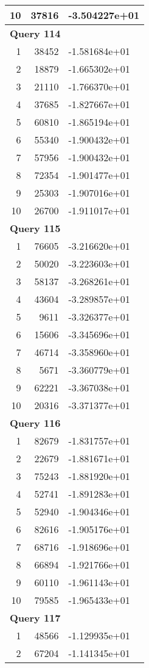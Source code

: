 \begin{longtable}[{p}]{@{}rrp{}@{}}
10 & 37816 & -3.504227e+01 \\
\midrule
\multicolumn{3}{l}{\bfseries Query 114} \\
1 & 38452 & -1.581684e+01 \\
2 & 18879 & -1.665302e+01 \\
3 & 21110 & -1.766370e+01 \\
4 & 37685 & -1.827667e+01 \\
5 & 60810 & -1.865194e+01 \\
6 & 55340 & -1.900432e+01 \\
7 & 57956 & -1.900432e+01 \\
8 & 72354 & -1.901477e+01 \\
9 & 25303 & -1.907016e+01 \\
10 & 26700 & -1.911017e+01 \\
\midrule
\multicolumn{3}{l}{\bfseries Query 115} \\
1 & 76605 & -3.216620e+01 \\
2 & 50020 & -3.223603e+01 \\
3 & 58137 & -3.268261e+01 \\
4 & 43604 & -3.289857e+01 \\
5 & 9611 & -3.326377e+01 \\
6 & 15606 & -3.345696e+01 \\
7 & 46714 & -3.358960e+01 \\
8 & 5671 & -3.360779e+01 \\
9 & 62221 & -3.367038e+01 \\
10 & 20316 & -3.371377e+01 \\
\midrule
\multicolumn{3}{l}{\bfseries Query 116} \\
1 & 82679 & -1.831757e+01 \\
2 & 22679 & -1.881671e+01 \\
3 & 75243 & -1.881920e+01 \\
4 & 52741 & -1.891283e+01 \\
5 & 52940 & -1.904346e+01 \\
6 & 82616 & -1.905176e+01 \\
7 & 68716 & -1.918696e+01 \\
8 & 66894 & -1.921766e+01 \\
9 & 60110 & -1.961143e+01 \\
10 & 79585 & -1.965433e+01 \\
\midrule
\multicolumn{3}{l}{\bfseries Query 117} \\
1 & 48566 & -1.129935e+01 \\
2 & 67204 & -1.141345e+01 \\

\end{longtable}
